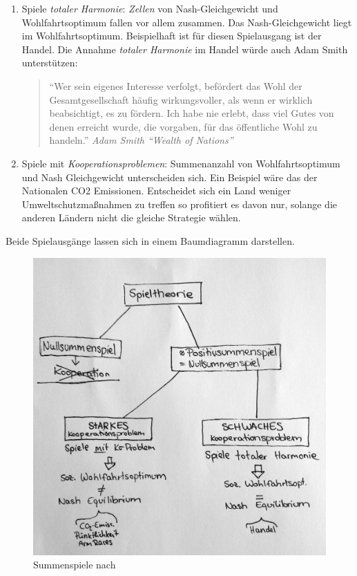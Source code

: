 \begin{enumerate}
		\item Spiele \emph{totaler Harmonie}: \emph{Zellen} von Nash-Gleichgewicht und Wohlfahrtsoptimum fallen vor allem zusammen. Das Nash-Gleichgewicht liegt im Wohlfahrtsoptimum.
		Beispielhaft ist für diesen Spielausgang ist der Handel.
		Die Annahme \emph{totaler Harmonie} im Handel würde auch Adam Smith unterstützen:

			\begin{quote}
				``Wer sein eigenes Interesse verfolgt, befördert das Wohl der Gesamtgesellschaft häufig wirkungsvoller, als wenn er wirklich beabsichtigt, es zu fördern. Ich habe nie erlebt, dass viel Gutes von denen erreicht wurde, die vorgaben, für das öffentliche Wohl zu handeln.'' \emph{Adam Smith ``Wealth of Nations''}
			\end{quote}

		\item Spiele mit \emph{Kooperationsproblemen}: Summenanzahl von Wohlfahrtsoptimum und Nash Gleichgewicht unterscheiden sich.
		Ein Beispiel wäre das der Nationalen CO2 Emissionen. Entscheidet sich ein Land weniger Umweltschutzmaßnahmen zu treffen so profitiert es davon nur, solange die anderen Ländern nicht die gleiche Strategie wählen.

\end{enumerate}

Beide Spielausgänge lassen sich in einem Baumdiagramm darstellen.

\begin{figure}[htbp]
	\begin{center}
	\includegraphics[width=1\textwidth]{img/summenspiele.jpg}
	\caption{Summenspiele nach \cite{Kleinberg-2009-oz}}
	\label{fig:gefangenendilemma}
	\end{center}
\end{figure}


